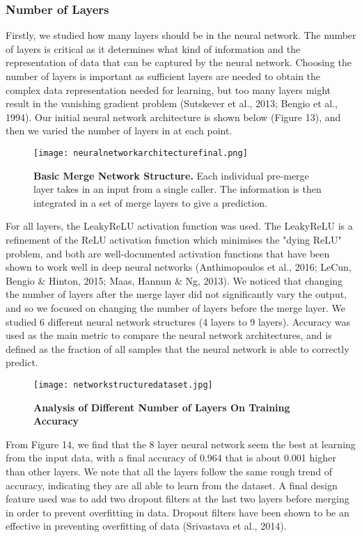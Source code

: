 \documentclass{article}
\begin{document}
\subsubsection{Number of Layers}
Firstly, we studied how many layers should be in the neural network. The number of layers is critical as it determines what kind of information and the representation of data that can be captured by the neural network. Choosing the number of layers is important as sufficient layers are needed to obtain the complex data representation needed for learning, but too many layers might result in the vanishing gradient problem (Sutskever et al., 2013; Bengio et al., 1994). Our initial neural network architecture is shown below (Figure 13), and then we varied the number of layers in at each point.
\begin{figure}[H]
\texttt{[image: neuralnetworkarchitecturefinal.png]}
\centering
\caption{\textbf{Basic Merge Network Structure.} Each individual pre-merge layer takes in an input from a single caller. The information is then integrated in a set of merge layers to give a prediction.}
\end{figure}
For all layers, the LeakyReLU activation function was used. The LeakyReLU is a refinement of the ReLU activation function which minimises the "dying ReLU" problem, and both are well-documented activation functions that have been shown to work well in deep neural networks (Anthimopoulos et al., 2016; LeCun, Bengio \& Hinton, 2015; Maas, Hannun \& Ng, 2013). We noticed that changing the number of layers after the merge layer did not significantly vary the output, and so we focused on changing the number of layers before the merge layer. We studied 6 different neural network structures (4 layers to 9 layers). Accuracy was used as the main metric to compare the neural network architectures, and is defined as the fraction of all samples that the neural network is able to correctly predict.
\begin{figure}[H]
\texttt{[image: networkstructuredataset.jpg]}
\centering
\caption{\textbf{Analysis of Different Number of Layers On Training Accuracy}}
\end{figure}
From Figure 14, we find that the 8 layer neural network seem the best at learning from the input data, with a final accuracy of 0.964 that is about 0.001 higher than other layers. We note that all the layers follow the same rough trend of accuracy, indicating they are all able to learn from the dataset.  A final design feature used was to add two dropout filters at the last two layers before merging in order to prevent overfitting in data. Dropout filters have been shown to be an effective in preventing overfitting of data (Srivastava et al., 2014).\\\\
\end{document}
